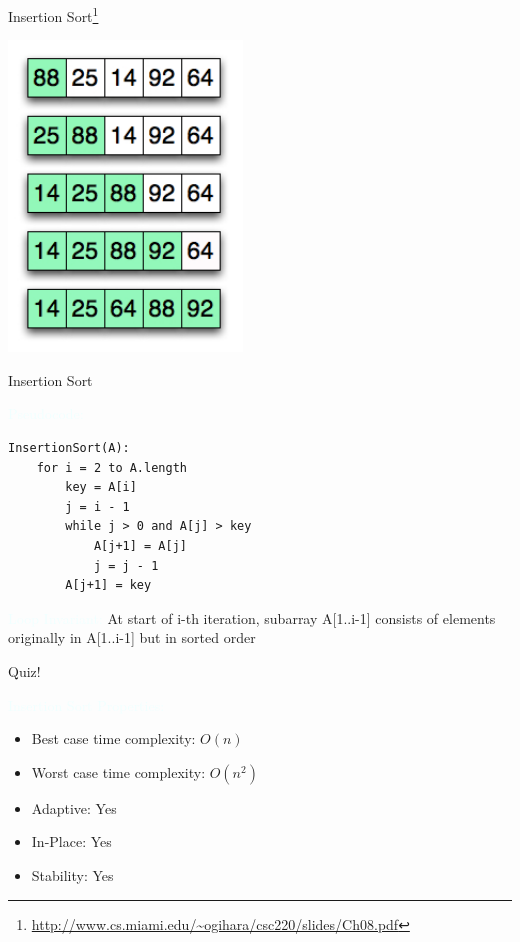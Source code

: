 \documentclass{beamer}
\newcommand{\tblue}[1]{{\Large {\textcolor{azure}{#1}}}}
\begin{document}
\begin{frame}{Insertion Sort\footnote{\url{http://www.cs.miami.edu/~ogihara/csc220/slides/Ch08.pdf}}}
\begin{center}
    \includegraphics[scale=0.5]{insertionSort.png}
\end{center}
\end{frame}




\begin{frame}[fragile]{Insertion Sort}

\tblue{Pseudocode:}
\begin{verbatim}
InsertionSort(A):
    for i = 2 to A.length
        key = A[i]
        j = i - 1
        while j > 0 and A[j] > key
            A[j+1] = A[j]
            j = j - 1
        A[j+1] = key
\end{verbatim}

\tblue{Loop Invariant:} At start of i-th iteration, subarray A[1..i-1] consists of elements originally in A[1..i-1] but in sorted order
\end{frame}


\begin{frame}{Quiz!}

\tblue{Insertion Sort Properties:}

\begin{itemize}
\item Best case time complexity:  $O(n)$
\item Worst case time complexity: $O(n^2)$
\item Adaptive: Yes
\item In-Place: Yes
\item Stability: Yes
\end{itemize}
\end{frame}
\end{document}
